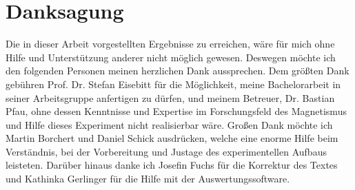 \chapter*{Danksagung}
Die in dieser Arbeit vorgestellten Ergebnisse zu erreichen, wäre für mich ohne Hilfe und Unterstützung anderer nicht möglich gewesen. Deswegen möchte ich den folgenden Personen meinen herzlichen Dank aussprechen. Dem größten Dank gebühren Prof. Dr. Stefan Eisebitt für die Möglichkeit, meine Bachelorarbeit in seiner Arbeitsgruppe anfertigen zu dürfen, und meinem Betreuer, Dr. Bastian Pfau, ohne dessen Kenntnisse und Expertise im Forschungsfeld des Magnetismus und Hilfe dieses Experiment nicht realisierbar wäre. Großen Dank möchte ich Martin Borchert und Daniel Schick ausdrücken, welche eine enorme Hilfe beim Verständnis, bei der Vorbereitung und Justage des experimentellen Aufbaus leisteten. Darüber hinaus danke ich Josefin Fuchs für die Korrektur des Textes und Kathinka Gerlinger für die Hilfe mit der Auswertungssoftware.